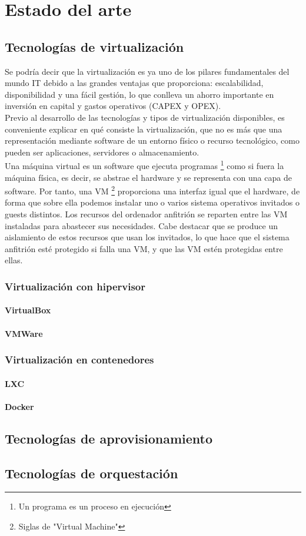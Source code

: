 \chapter{Estado del arte}
\section{Tecnologías de virtualización}
Se podría decir que la virtualización es ya uno de los pilares fundamentales del mundo IT debido a las grandes ventajas que proporciona: escalabilidad, disponibilidad y una fácil gestión, lo que conlleva un ahorro importante en inversión en capital y gastos operativos (CAPEX y OPEX). \\

Previo al desarrollo de las tecnologías y tipos de virtualización disponibles, es conveniente explicar en qué consiste la virtualización, que no es más que una representación mediante software de un entorno físico o recurso tecnológico, como pueden ser aplicaciones, servidores o almacenamiento. \\ 

Una máquina virtual es un software que ejecuta programas \footnote{Un programa es un proceso en ejecución} como si fuera la máquina física, es decir, se abstrae el hardware y se representa con una capa de software. Por tanto, una VM \footnote{Siglas de "Virtual Machine"} proporciona una interfaz igual que el hardware, de forma que sobre ella podemos instalar uno o varios sistema operativos invitados o guests distintos. Los recursos del ordenador anfitrión se reparten entre las VM instaladas para abastecer sus necesidades. Cabe destacar que se produce un aislamiento de estos recursos que usan los invitados, lo que hace que el sistema anfitrión esté protegido si falla una VM, y que las VM estén protegidas entre ellas. 


\subsection{Virtualización con hipervisor}
\subsubsection{VirtualBox}
\subsubsection{VMWare}
\subsection{Virtualización en contenedores}
\subsubsection{LXC}
\subsubsection{Docker}
\section{Tecnologías de aprovisionamiento}
\section{Tecnologías de orquestación}
